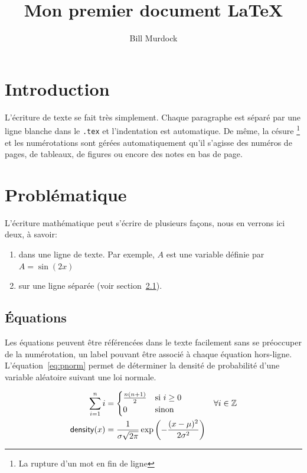 \documentclass[12pt]{article} %
\author{Bill Murdock}
\title{Mon premier document \LaTeX}
\begin{document}
\maketitle

\tableofcontents
\newpage

\section{Introduction}
L'écriture de texte se fait très simplement. Chaque paragraphe est séparé par une ligne blanche dans le \verb|.tex| et l'indentation est automatique. De même, la césure \footnote{La rupture d'un mot en fin de ligne} et les numérotations sont gérées automatiquement qu'il s'agisse des numéros de pages, de tableaux, de figures ou encore des notes en bas de page.

\section{Problématique}

L'écriture mathématique peut s'écrire de plusieurs façons, nous en verrons ici deux, à savoir:
\begin{enumerate}
 	\item dans une ligne de texte.
      Par exemple, $A$ est une variable définie par $A=\sin(2x)$
 	\item sur une ligne séparée (voir section~\ref{eq}).
 \end{enumerate}

\subsection{Équations}\label{eq}

Les équations peuvent être référencées dans le texte facilement sans se préoccuper de la numérotation, un label pouvant être associé à chaque équation hors-ligne.
L'équation~\eqref{eq:pnorm} permet de déterminer la densité de probabilité d'une variable aléatoire suivant une loi normale.

\begin{align}
  \notag
  \sum_{i=1}^n i & =
  \begin{cases}
    \frac{n (n+1)}{2} & \text{si } i \geq 0\\
    0 & \text{sinon}
  \end{cases} & \forall i \in \mathbb{Z}\\
  \label{eq:pnorm}
  \mathsf{density}(x) & = \frac{1}{\sigma \sqrt{2\pi}} \exp \left(-\frac{(x-\mu)^2}{2\sigma^2}\right)
\end{align}
\end{document}
